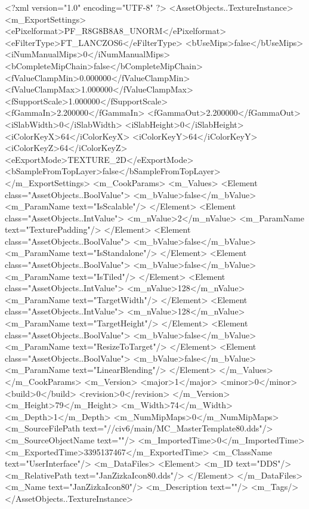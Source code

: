 <?xml version="1.0" encoding="UTF-8" ?>
<AssetObjects..TextureInstance>
	<m_ExportSettings>
		<ePixelformat>PF_R8G8B8A8_UNORM</ePixelformat>
		<eFilterType>FT_LANCZOS6</eFilterType>
		<bUseMips>false</bUseMips>
		<iNumManualMips>0</iNumManualMips>
		<bCompleteMipChain>false</bCompleteMipChain>
		<fValueClampMin>0.000000</fValueClampMin>
		<fValueClampMax>1.000000</fValueClampMax>
		<fSupportScale>1.000000</fSupportScale>
		<fGammaIn>2.200000</fGammaIn>
		<fGammaOut>2.200000</fGammaOut>
		<iSlabWidth>0</iSlabWidth>
		<iSlabHeight>0</iSlabHeight>
		<iColorKeyX>64</iColorKeyX>
		<iColorKeyY>64</iColorKeyY>
		<iColorKeyZ>64</iColorKeyZ>
		<eExportMode>TEXTURE_2D</eExportMode>
		<bSampleFromTopLayer>false</bSampleFromTopLayer>
	</m_ExportSettings>
	<m_CookParams>
		<m_Values>
			<Element class="AssetObjects..BoolValue">
				<m_bValue>false</m_bValue>
				<m_ParamName text="IsScalable"/>
			</Element>
			<Element class="AssetObjects..IntValue">
				<m_nValue>2</m_nValue>
				<m_ParamName text="TexturePadding"/>
			</Element>
			<Element class="AssetObjects..BoolValue">
				<m_bValue>false</m_bValue>
				<m_ParamName text="IsStandalone"/>
			</Element>
			<Element class="AssetObjects..BoolValue">
				<m_bValue>false</m_bValue>
				<m_ParamName text="IsTiled"/>
			</Element>
			<Element class="AssetObjects..IntValue">
				<m_nValue>128</m_nValue>
				<m_ParamName text="TargetWidth"/>
			</Element>
			<Element class="AssetObjects..IntValue">
				<m_nValue>128</m_nValue>
				<m_ParamName text="TargetHeight"/>
			</Element>
			<Element class="AssetObjects..BoolValue">
				<m_bValue>false</m_bValue>
				<m_ParamName text="ResizeToTarget"/>
			</Element>
			<Element class="AssetObjects..BoolValue">
				<m_bValue>false</m_bValue>
				<m_ParamName text="LinearBlending"/>
			</Element>
		</m_Values>
	</m_CookParams>
	<m_Version>
		<major>1</major>
		<minor>0</minor>
		<build>0</build>
		<revision>0</revision>
	</m_Version>
	<m_Height>79</m_Height>
	<m_Width>74</m_Width>
	<m_Depth>1</m_Depth>
	<m_NumMipMaps>0</m_NumMipMaps>
	<m_SourceFilePath text="//civ6/main/MC_MasterTemplate\Textures\JanZizkaIcon80.dds"/>
	<m_SourceObjectName text=""/>
	<m_ImportedTime>0</m_ImportedTime>
	<m_ExportedTime>3395137467</m_ExportedTime>
	<m_ClassName text="UserInterface"/>
	<m_DataFiles>
		<Element>
			<m_ID text="DDS"/>
			<m_RelativePath text="JanZizkaIcon80.dds"/>
		</Element>
	</m_DataFiles>
	<m_Name text="JanZizkaIcon80"/>
	<m_Description text=""/>
	<m_Tags/>
</AssetObjects..TextureInstance>

